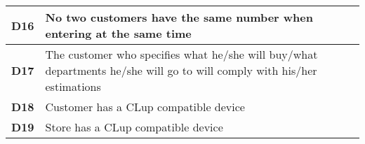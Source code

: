 \begin{center}
{\begin{tabular}{L{2cm}L{12cm}}
            \hline
            \textbf{D16} & No two customers have the same number when entering at the same time \\
            \hline
            \textbf{D17} & The customer who specifies what he/she will buy/what departments he/she will go to will comply with his/her estimations \\
            \hline
            \textbf{D18} & Customer has a CLup compatible device \\
            \hline
            \textbf{D19} & Store has a CLup compatible device \\
            \hline
        \end{tabular}}
    \end{center}